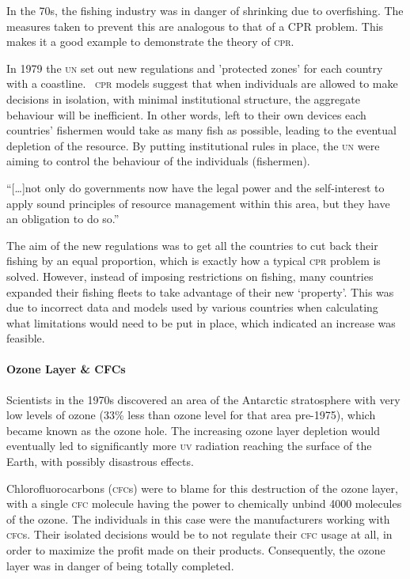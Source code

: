 In the 70s, the fishing industry was in danger of shrinking due to overfishing. The measures taken to prevent this are analogous to that of a CPR problem. This makes it a good example to demonstrate the theory of \textsc{cpr}.

In 1979 the \textsc{un} set out new regulations and 'protected zones' for each country with a coastline.~\cite{Canada-sea-law} \textsc{cpr} models suggest that when individuals are allowed to make decisions in isolation, with minimal institutional structure, the aggregate behaviour will be inefficient. In other words, left to their own devices each countries' fishermen would take as many fish as possible, leading to the eventual depletion of the resource. By putting institutional rules in place, the \textsc{un} were aiming to control the behaviour of the individuals (fishermen).

``[\ldots]not only do governments now have the legal power and the self-interest to apply sound principles of resource management within this area, but they have an obligation to do so.''

The aim of the new regulations was to get all the countries to cut back their fishing by an equal proportion, which is exactly how a typical \textsc{cpr} problem is solved. However, instead of imposing restrictions on fishing, many countries expanded their fishing fleets to take advantage of their new `property'. This was due to incorrect data and models used by various countries when calculating what limitations would need to be put in place, which indicated an increase was feasible.

\paragraph{Ozone Layer \& CFCs}

Scientists in the 1970s discovered an area of the Antarctic stratosphere with very low levels of ozone (33\% less than ozone level for that area pre-1975), which became known as the ozone hole. The increasing ozone layer depletion would eventually led to significantly more \textsc{uv} radiation reaching the surface of the Earth, with possibly disastrous effects.

Chlorofluorocarbons (\textsc{cfc}s) were to blame for this destruction of the ozone layer, with a single \textsc{cfc} molecule having the power to chemically unbind 4000 molecules of the ozone. The individuals in this case were the manufacturers working with \textsc{cfc}s. Their isolated decisions would be to not regulate their \textsc{cfc} usage at all, in order to maximize the profit made on their products. Consequently, the ozone layer was in danger of being totally completed.

